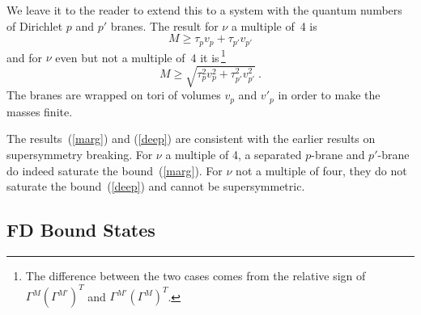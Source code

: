 \documentclass[12pt]{article}
\def\be{\begin{equation}}
\def\ee{\end{equation}}
\begin{document}
We leave it to the reader to extend this to a system with the quantum numbers
of Dirichlet $p$ and $p'$ branes. The result for $\nu$ a multiple of~4 is
\be
M \geq \tau_p v_p + \tau_{p'} v_{p'} \label{marg}
\ee
and for $\nu$ even but not a multiple of~4 it is\,\footnote{The difference
between the two cases comes from the relative sign of
$\Gamma^M (\Gamma^{M'})^T$ and $\Gamma^{M'} (\Gamma^{M})^T$. }
\be
M \geq \sqrt{\tau^2_p v^2_p + \tau^2_{p'} v^2_{p'} }\ .
\label{deep}
\ee
The branes are wrapped
on tori of volumes $v_p$ and $v'_p$ in order to make the masses finite.

The results~(\ref{marg}) and (\ref{deep}) are consistent with the earlier
results on supersymmetry breaking.  For $\nu$ a multiple of 4, a
separated $p$-brane and $p'$-brane do indeed saturate the
bound~(\ref{marg}).  For $\nu$ not a multiple of four, they do not saturate
the bound~(\ref{deep}) and cannot be supersymmetric.

\subsection{FD Bound States}
\end{document}
